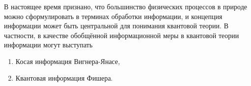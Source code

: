 В настоящее время признано,
что большинство физических процессов в природе можно сформулировать в терминах обработки информации,
и концепция информации может быть центральной для понимания квантовой теории\cite{Zurek1990, Summhammer1994, Frieden2004}.
В частности, в качестве обобщённой информационной меры в квантовой теории информации могут выступать
\begin{enumerate}
  \item Косая информация Вигнера-Янасе\cite{Zeqian2005},
  \item Квантовая информация Фишера\cite{Hyllus2012}.
\end{enumerate}

